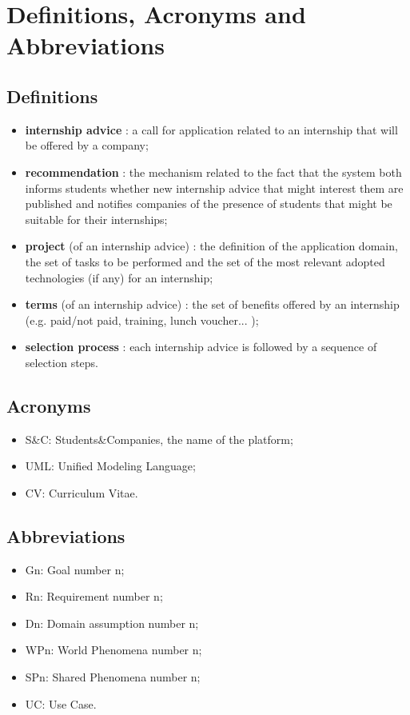 	\section{Definitions, Acronyms and Abbreviations}
		\subsection{Definitions}
			\begin{itemize}
				\item \textbf{internship advice} : a call for application related to an internship that will be offered by a company;
				\item \textbf{recommendation} : the mechanism related to the fact that the system both informs students whether new internship advice that might interest them are published and notifies companies of the presence of students that might be suitable for their internships;
				\item \textbf{project} (of an internship advice) : the definition of the application domain, the set of tasks to be performed and the set of the most relevant adopted technologies (if any) for an internship;
				\item \textbf{terms} (of an internship advice) : the set of benefits offered by an internship (e.g. paid/not paid, training, lunch voucher... );
				\item \textbf{selection process} : each internship advice is followed by a sequence of selection steps.
			\end{itemize}
		\subsection{Acronyms}
			\begin{itemize}
				\item S\&C: Students\&Companies, the name of the platform;
				\item UML: Unified Modeling Language;
				\item CV: Curriculum Vitae.
			\end{itemize}
		\subsection{Abbreviations}
			\begin{itemize}
				\item Gn: Goal number n;
				\item Rn: Requirement number n;
				\item Dn: Domain assumption number n;
				\item WPn: World Phenomena number n;
				\item SPn: Shared Phenomena number n;
				\item UC: Use Case.
			\end{itemize}
